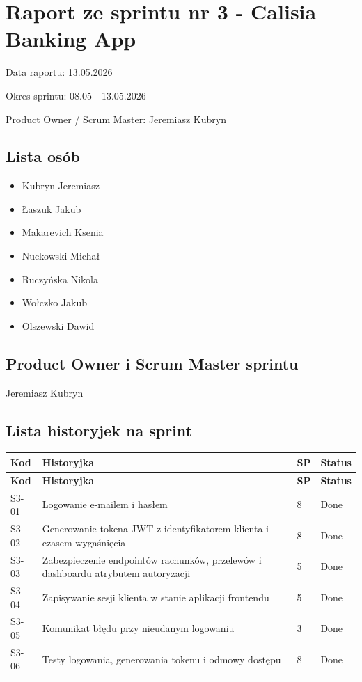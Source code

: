 \documentclass[12pt,a4paper]{article}
\begin{document}
\section*{Raport ze sprintu nr 3 - Calisia Banking App}
Data raportu: 13.05.2026

Okres sprintu: 08.05 - 13.05.2026

Product Owner / Scrum Master: Jeremiasz Kubryn

\subsection*{Lista osób}
\begin{itemize}
\item Kubryn Jeremiasz
\item Łaszuk Jakub
\item Makarevich Ksenia
\item Nuckowski Michał
\item Ruczyńska Nikola
\item Wołczko Jakub
\item Olszewski Dawid
\end{itemize}

\subsection*{Product Owner i Scrum Master sprintu}
Jeremiasz Kubryn

\subsection*{Lista historyjek na sprint}
\begingroup
\footnotesize
{}
\begin{longtable}{@{}C{0.08\textwidth}L{0.62\textwidth}C{0.10\textwidth}L{0.12\textwidth}@{}}
\toprule
{}
\textbf{Kod} & \textbf{Historyjka} & \textbf{SP} & \textbf{Status} \\
\midrule
\endfirsthead
\toprule
{}
\textbf{Kod} & \textbf{Historyjka} & \textbf{SP} & \textbf{Status} \\
\midrule
\endhead
S3-01 & Logowanie e-mailem i hasłem & 8 & Done \\
S3-02 & Generowanie tokena JWT z identyfikatorem klienta i czasem wygaśnięcia & 8 & Done \\
S3-03 & Zabezpieczenie endpointów rachunków, przelewów i dashboardu atrybutem autoryzacji & 5 & Done \\
S3-04 & Zapisywanie sesji klienta w stanie aplikacji frontendu & 5 & Done \\
S3-05 & Komunikat błędu przy nieudanym logowaniu & 3 & Done \\
S3-06 & Testy logowania, generowania tokenu i odmowy dostępu & 8 & Done \\
\bottomrule
\end{longtable}
\endgroup
\end{document}
